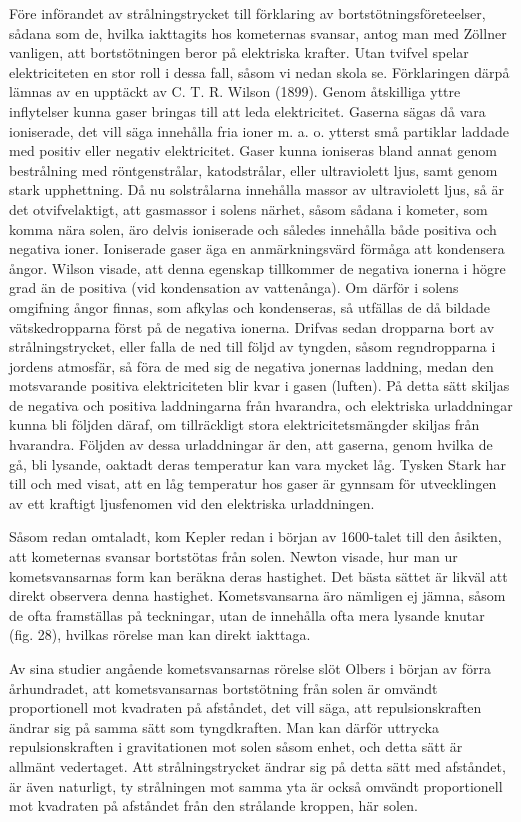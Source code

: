 \documentclass[a4paper, 12pt, oneside, swedish]{article}
\begin{document}
Före införandet av strålningstrycket till förklaring av bortstötningsföreteelser, sådana som de, hvilka iakttagits hos kometernas svansar, antog man med Zöllner vanligen, att bortstötningen beror på elektriska krafter. Utan tvifvel spelar elektriciteten en stor roll i dessa fall, såsom vi nedan skola se. Förklaringen därpå lämnas av en upptäckt av C. T. R. Wilson (1899). Genom åtskilliga yttre inflytelser kunna gaser bringas till att leda elektricitet. Gaserna sägas då vara ioniserade, det vill säga innehålla fria ioner m. a. o. ytterst små partiklar laddade med positiv eller negativ elektricitet. Gaser kunna ioniseras bland annat genom bestrålning med röntgenstrålar, katodstrålar, eller ultraviolett ljus, samt genom stark upphettning. Då nu solstrålarna innehålla massor av ultraviolett ljus, så är det otvifvelaktigt, att gasmassor i solens närhet, såsom sådana i kometer, som komma nära solen, äro delvis ioniserade och således innehålla både positiva och negativa ioner. Ioniserade gaser äga en anmärkningsvärd förmåga att kondensera ångor. Wilson visade, att denna egenskap tillkommer de negativa ionerna i högre grad än de positiva (vid kondensation av vattenånga). Om därför i solens omgifning ångor finnas, som afkylas och kondenseras, så utfällas de då bildade vätskedropparna först på de negativa ionerna. Drifvas sedan dropparna bort av strålningstrycket, eller falla de ned till följd av tyngden, såsom regndropparna i jordens atmosfär, så föra de med sig de negativa jonernas laddning, medan den motsvarande positiva elektriciteten blir kvar i gasen (luften). På detta sätt skiljas de negativa och positiva laddningarna från hvarandra, och elektriska urladdningar kunna bli följden däraf, om tillräckligt stora elektricitetsmängder skiljas från hvarandra. Följden av dessa urladdningar är den, att gaserna, genom hvilka de gå, bli lysande, oaktadt deras temperatur kan vara mycket låg. Tysken Stark har till och med visat, att en låg temperatur hos gaser är gynnsam för utvecklingen av ett kraftigt ljusfenomen vid den elektriska urladdningen.

Såsom redan omtaladt, kom Kepler redan i början av 1600-talet till den åsikten, att kometernas svansar bortstötas från solen. Newton visade, hur man ur kometsvansarnas form kan beräkna deras hastighet. Det bästa sättet är likväl att direkt observera denna hastighet. Kometsvansarna äro nämligen ej jämna, såsom de ofta framställas på teckningar, utan de innehålla ofta mera lysande knutar (fig. 28), hvilkas rörelse man kan direkt iakttaga.

Av sina studier angående kometsvansarnas rörelse slöt Olbers i början av förra århundradet, att kometsvansarnas bortstötning från solen är omvändt proportionell mot kvadraten på afståndet, det vill säga, att repulsionskraften ändrar sig på samma sätt som tyngdkraften. Man kan därför uttrycka repulsionskraften i gravitationen mot solen såsom enhet, och detta sätt är allmänt vedertaget. Att strålningstrycket ändrar sig på detta sätt med afståndet, är även naturligt, ty strålningen mot samma yta är också omvändt proportionell mot kvadraten på afståndet från den strålande kroppen, här solen.
\end{document}
